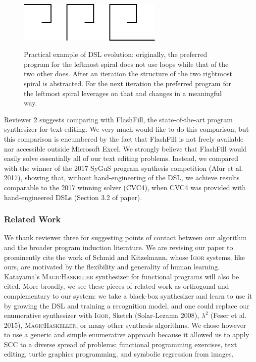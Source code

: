 \documentclass{article}
\begin{document}
\begin{figure}
  \centering
  \includegraphics[width=7cm]{figures/rebutal/spirals.eps}\label{geomCompiled}
  \caption{Practical example of DSL evolution: originally, the preferred program
  for the leftmost spiral does not use loops while that of the two other does.
  After an iteration the structure of the two rightmost spiral is abstracted.
  For the next iteration the preferred program for the leftmost spiral leverages
  on that and changes in a meaningful way.}
\end{figure}

Reviewer 2 suggests comparing with FlashFill, the state-of-the-art program synthesizer for text editing.
We very much would like to do this comparison, but this comparison
is encumbered by the fact that FlashFill is not freely available nor accessible outside Microsoft Excel.
We strongly believe that FlashFill would easily solve essentially all of our text editing problems.
Instead, we compared with the winner of the 2017 SyGuS program synthesis competition (Alur et al. 2017), 
showing that, without hand-engineering of the DSL,
we achieve results comparable to the 2017 winning solver (CVC4),
when CVC4 was provided with hand-engineered DSLs (Section 3.2 of paper).
\subsubsection*{Related Work}

We thank reviewer three for suggesting points of contact between our algorithm and the broader program induction literature.
We are revising our paper to prominently cite the work of Schmid and Kitzelmann,
whose \textsc{Igor} systems, like ours,
are motivated by the flexibility and generality of human learning.
Katayama's \textsc{MagicHaskeller} synthesizer for functional programs will also be cited.
More broadly,
we see these pieces of related work as
orthogonal and complementary to
our system:
we take a black-box synthesizer and
learn to use it by growing the DSL and
training a recognition model,
and one could replace our enumerative synthesizer with
\textsc{Igor}, Sketch (Solar-Lezama 2008), $\lambda^2$ (Feser et al. 2015), \textsc{MagicHaskeller},
or many other synthesis algorithms.
We chose however to
use a generic and simple enumerative approach because it allowed us to apply SCC
to a diverse spread of problems: functional programming exercises, text editing,
turtle graphics programming, and symbolic regression from images.
\end{document}
